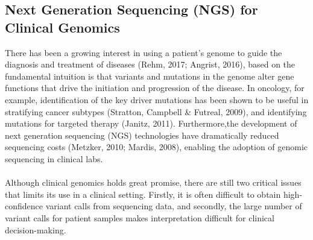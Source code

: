 \documentclass{article}
\begin{document}
\subsection{Next Generation Sequencing (NGS) for Clinical Genomics}
There has been a growing interest in using a patient's genome to guide the diagnosis and treatment of diseases (Rehm, 2017; Angrist, 2016), based on the fundamental intuition is that variants and mutations in the genome alter gene functions that drive the initiation and progression of the disease. In oncology, for example, identification of the key driver mutations has been shown to be useful in stratifying cancer subtypes (Stratton, Campbell \& Futreal, 2009), and identifying mutations for targeted therapy (Janitz, 2011). Furthermore,the development of next generation sequencing (NGS) technologies have dramatically reduced sequencing costs (Metzker, 2010; Mardis, 2008), enabling the adoption of genomic sequencing in clinical labs. \\\\ Although clinical genomics holds great promise, there are still two critical issues that limits its use in a clinical setting. Firstly, it is often difficult to obtain high-confidence variant calls from sequencing data, and secondly, the large number of variant calls for patient samples makes  interpretation difficult for clinical decision-making.
\end{document}
